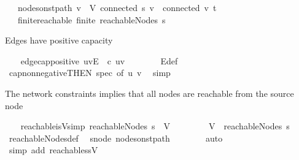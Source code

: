 \begin{isabellebody}
\ \ \ nodes{\isacharunderscore}on{\isacharunderscore}st{\isacharunderscore}path{\isacharcolon}\ {\isachardoublequoteopen}{\isasymforall}v\ {\isasymin}\ V{\isachardot}\ connected\ s\ v\ {\isasymand}\ connected\ v\ t{\isachardoublequoteclose}\isanewline
\ \ \ finite{\isacharunderscore}reachable{\isacharcolon}\ {\isachardoublequoteopen}finite\ {\isacharparenleft}reachableNodes\ s{\isacharparenright}{\isachardoublequoteclose}\isanewline
{}%
\begin{isamarkuptext}%
Edges have positive capacity%
\end{isamarkuptext}\isamarkuptrue%
\ \ \isamarkupfalse%
\ edge{\isacharunderscore}cap{\isacharunderscore}positive{\isacharcolon}\ {\isachardoublequoteopen}{\isacharparenleft}u{\isacharcomma}v{\isacharparenright}{\isasymin}E\ {\isasymLongrightarrow}\ c\ {\isacharparenleft}u{\isacharcomma}v{\isacharparenright}\ {\isachargreater}\ {}{\isachardoublequoteclose}\isanewline
%
\isadelimproof
\ \ \ \ %
\endisadelimproof
%
\isatagproof
{}\isamarkupfalse%
\ E{\isacharunderscore}def\ \isamarkupfalse%
\ cap{\isacharunderscore}non{\isacharunderscore}negative{\isacharbrackleft}THEN\ spec{}{\isacharcomma}\ of\ u\ v{\isacharbrackright}\ \isamarkupfalse%
\ simp%
\endisatagproof
{\isafoldproof}%
%
\isadelimproof
%
\endisadelimproof
%
\begin{isamarkuptext}%
The network constraints implies that all nodes are 
    reachable from the source node%
\end{isamarkuptext}\isamarkuptrue%
\ \ \isamarkupfalse%
\ reachable{\isacharunderscore}is{\isacharunderscore}V{\isacharbrackleft}simp{\isacharbrackright}{\isacharcolon}\ {\isachardoublequoteopen}reachableNodes\ s\ {\isacharequal}\ V{\isachardoublequoteclose}\isanewline
%
\isadelimproof
\ \ %
\endisadelimproof
%
\isatagproof
{}\isamarkupfalse%
\isanewline
\ \ \ \ \isamarkupfalse%
\ {\isachardoublequoteopen}V\ {\isasymsubseteq}\ reachableNodes\ s{\isachardoublequoteclose}\isanewline
\ \ \ \ \isamarkupfalse%
\ reachableNodes{\isacharunderscore}def\ \isamarkupfalse%
\ s{\isacharunderscore}node\ nodes{\isacharunderscore}on{\isacharunderscore}st{\isacharunderscore}path\isanewline
\ \ \ \ \ \ \isamarkupfalse%
\ auto\isanewline
\ \ \isamarkupfalse%
\ {\isacharparenleft}simp\ add{\isacharcolon}\ reachable{\isacharunderscore}ss{\isacharunderscore}V{\isacharparenright}%

\end{isabellebody}
